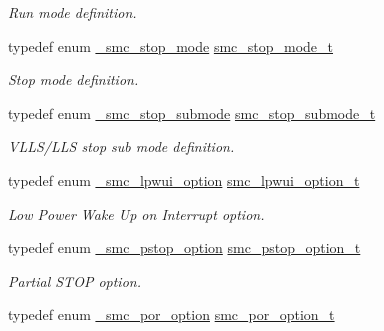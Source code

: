 \begin{DoxyCompactItemize}
\begin{DoxyCompactList}\small\item\em Run mode definition. \end{DoxyCompactList}\item 
typedef enum \hyperlink{group__smc__hal_ga107d1c64902b4a1a0270a51008b854d5}{\+\_\+smc\+\_\+stop\+\_\+mode} \hyperlink{group__smc__hal_ga2fdba7a72fb477e8b4515b3a52055291}{smc\+\_\+stop\+\_\+mode\+\_\+t}\hypertarget{group__smc__hal_ga2fdba7a72fb477e8b4515b3a52055291}{}\label{group__smc__hal_ga2fdba7a72fb477e8b4515b3a52055291}

\begin{DoxyCompactList}\small\item\em Stop mode definition. \end{DoxyCompactList}\item 
typedef enum \hyperlink{group__smc__hal_ga027958611f3cd8ff735b930abe16c85c}{\+\_\+smc\+\_\+stop\+\_\+submode} \hyperlink{group__smc__hal_ga320ac5c2c75de55f308be3f6735e0268}{smc\+\_\+stop\+\_\+submode\+\_\+t}\hypertarget{group__smc__hal_ga320ac5c2c75de55f308be3f6735e0268}{}\label{group__smc__hal_ga320ac5c2c75de55f308be3f6735e0268}

\begin{DoxyCompactList}\small\item\em V\+L\+L\+S/\+L\+LS stop sub mode definition. \end{DoxyCompactList}\item 
typedef enum \hyperlink{group__smc__hal_ga0c1669996e3a8ecbefa05a8d82853d0d}{\+\_\+smc\+\_\+lpwui\+\_\+option} \hyperlink{group__smc__hal_ga6f2c4f521fe8cbb985bfd44173e5bcaf}{smc\+\_\+lpwui\+\_\+option\+\_\+t}\hypertarget{group__smc__hal_ga6f2c4f521fe8cbb985bfd44173e5bcaf}{}\label{group__smc__hal_ga6f2c4f521fe8cbb985bfd44173e5bcaf}

\begin{DoxyCompactList}\small\item\em Low Power Wake Up on Interrupt option. \end{DoxyCompactList}\item 
typedef enum \hyperlink{group__smc__hal_ga20f680799b3ac8137b69dbff639e34bb}{\+\_\+smc\+\_\+pstop\+\_\+option} \hyperlink{group__smc__hal_ga2f6c22063cc71c44fdb0afe0523b85e9}{smc\+\_\+pstop\+\_\+option\+\_\+t}\hypertarget{group__smc__hal_ga2f6c22063cc71c44fdb0afe0523b85e9}{}\label{group__smc__hal_ga2f6c22063cc71c44fdb0afe0523b85e9}

\begin{DoxyCompactList}\small\item\em Partial S\+T\+OP option. \end{DoxyCompactList}\item 
typedef enum \hyperlink{group__smc__hal_ga31c58c747f4a95851a1b6a0b73e81078}{\+\_\+smc\+\_\+por\+\_\+option} \hyperlink{group__smc__hal_ga753aaf847f5b8c29c513987f71c2feff}{smc\+\_\+por\+\_\+option\+\_\+t}\hypertarget{group__smc__hal_ga753aaf847f5b8c29c513987f71c2feff}{}\label{group__smc__hal_ga753aaf847f5b8c29c513987f71c2feff}


\end{DoxyCompactItemize}
